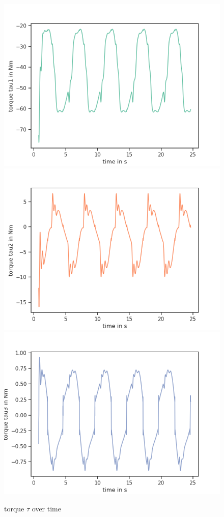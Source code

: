 \documentclass[a4paper,10pt]{article}
\begin{document}
\begin{figure}[H]
  \centering
  \includegraphics[scale=0.6]{img/C3_tau0}
  \includegraphics[scale=0.6]{img/C3_tau1}
  \includegraphics[scale=0.6]{img/C3_tau2}
  \caption{torque $\tau$ over time}
\end{figure}
\end{document}
